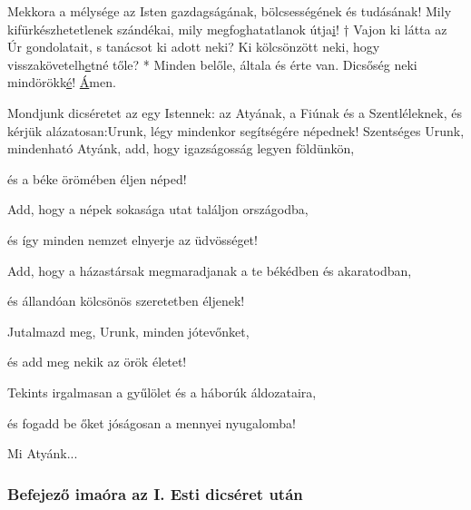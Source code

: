 \documentclass[twoside]{article}
\begin{document}
Mekkora a mélysége az Isten gazdagságának, bölcsességének és tudásának! Mily kifürkészhetetlenek szándékai, mily megfoghatatlanok útja\underline{i}! † Vajon ki látta az Úr gondolatait, s tanácsot ki adott neki? Ki kölcsönzött neki, hogy visszakövetelh\underline{e}tné tőle? * Minden belőle, általa és érte van. Dicsőség neki mindörökk\underline{é}! \underline{Á}men.



\begin{preces}{Mondjunk dicséretet az egy Istennek: az Atyának, a Fiúnak és a Szentléleknek, és kérjük alázatosan:}{Urunk, légy mindenkor segítségére népednek!}
  Szentséges Urunk, mindenható Atyánk, add, hogy igazságosság legyen földünkön,

  \reddash és a béke örömében éljen néped!

  Add, hogy a népek sokasága utat találjon országodba,

  \reddash és így minden nemzet elnyerje az üdvösséget!

  Add, hogy a házastársak megmaradjanak a te békédben és akaratodban,

  \reddash és állandóan kölcsönös szeretetben éljenek!

  Jutalmazd meg, Urunk, minden jótevőnket,

  \reddash és add meg nekik az örök életet!

  Tekints irgalmasan a gyűlölet és a háborúk áldozataira,

  \reddash és fogadd be őket jóságosan a mennyei nyugalomba!
\end{preces}
Mi Atyánk...


\subsubsection*{Befejező imaóra az I. Esti dicséret után}
\end{document}
